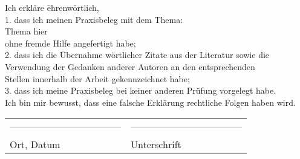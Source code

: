 

\cleardoublepage 
{}
			\begin{tabbing}
		Ich erkläre \= ehrenwörtlich,\\[1cm]
		1. 	\> dass ich meinen Praxisbeleg mit dem Thema:\\[1cm]
		   	\> Thema hier\\[1cm]
		ohne fremde Hilfe angefertigt habe;\\[1cm]
		
		2.	\> dass ich die Übernahme wörtlicher Zitate aus der Literatur sowie die\\ 		  
			\>Verwendung der Gedanken anderer Autoren an den entsprechenden\\
			\> Stellen innerhalb der Arbeit gekennzeichnet habe;\\[0.5cm]
		
		3.	\> dass ich meine Praxisbeleg bei keiner anderen Prüfung vorgelegt habe. \\[1cm]
		Ich bin mir bewusst, dass eine falsche Erklärung rechtliche Folgen haben wird. \\[2cm]
		\end{tabbing}
		
		 \begin{tabular}{p{8cm}l}
		  ----------------------------------- &  ----------------------------------- \\
		  Ort, Datum & Unterschrift  \\
		 \end{tabular}